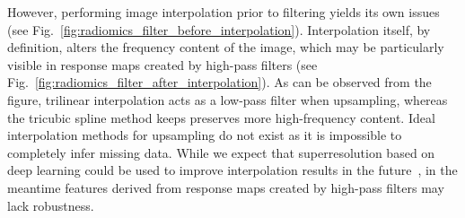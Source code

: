 \documentclass[fleqn,a4paper,oneside,openany]{book}
\begin{document}
However, performing image interpolation prior to filtering yields its own issues (see Fig.~\ref{fig:radiomics_filter_before_interpolation}). Interpolation itself, by definition, alters the frequency content of the image, which may be particularly visible in response maps created by  high-pass filters (see Fig.~\ref{fig:radiomics_filter_after_interpolation}). As can be observed from the figure, trilinear interpolation acts as a low-pass filter when upsampling, whereas the tricubic spline method keeps preserves more high-frequency content. Ideal interpolation methods for upsampling do not exist as it is impossible to completely infer missing data. While we expect that superresolution based on deep learning could be used to improve interpolation results in the future~\cite{Dong2014}, in the meantime features derived from response maps created by high-pass filters may lack robustness.
%
\end{document}
